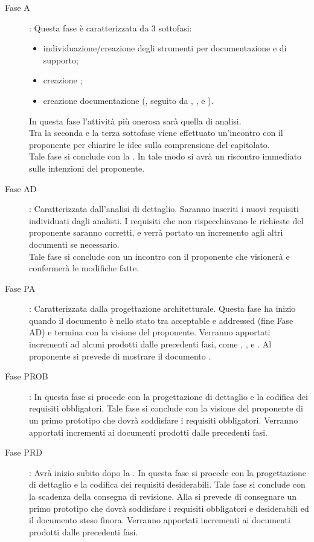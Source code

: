 		\begin{description}
			\item[Fase A]: Questa fase è caratterizzata da 3 sottofasi:
				\begin{itemize}
					\item individuazione/creazione degli strumenti per documentazione e di supporto;
					\item creazione ;
					\item creazione documentazione (, seguito da , ,  e ).
				\end{itemize}
				In questa fase l'attività più onerosa sarà quella di analisi.\\Tra la seconda e la terza sottofase viene effettuato un'incontro con il proponente per chiarire le idee sulla comprensione del capitolato.\\Tale fase si conclude con la . In tale modo si avrà un riscontro immediato sulle intenzioni del proponente.
			\item[Fase AD]: Caratterizzata dall’analisi di dettaglio. Saranno inseriti i nuovi requisiti individuati dagli analisti. I requisiti che non rispecchiavano le richieste del proponente saranno corretti, e verrà portato un incremento agli altri documenti se necessario.\\Tale fase si conclude con un incontro con il proponente che visionerà e confermerà le modifiche fatte.
			\item[Fase PA]: Caratterizzata dalla progettazione architetturale. Questa fase ha inizio quando il documento  è nello stato tra acceptable e addressed (fine Fase AD) e termina con la visione del proponente. Verranno apportati incrementi ad alcuni prodotti dalle precedenti fasi, come , ,  e . Al proponente si prevede di mostrare il documento .
			\item[Fase PROB]: In questa fase si procede con la progettazione di dettaglio e la codifica dei requisiti obbligatori. Tale fase si conclude con la visione del proponente di un primo prototipo che dovrà soddisfare i requisiti obbligatori. Verranno apportati incrementi ai documenti prodotti dalle precedenti fasi.
			\item[Fase PRD]: Avrà inizio subito dopo la . In questa fase si procede con la progettazione di dettaglio e la codifica dei requisiti desiderabili. Tale fase si conclude con la scadenza della consegna di revisione. Alla  si prevede di consegnare un primo prototipo che dovrà soddisfare i requisiti obbligatori e desiderabili ed il documento  steso finora. Verranno apportati incrementi ai documenti prodotti dalle precedenti fasi.

\end{description}
